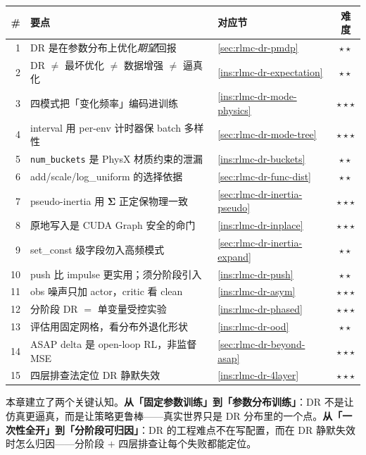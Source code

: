 \begin{center}
\small
\begin{tabular}{@{}rp{6.6cm}lc@{}}
\toprule
\# & 要点 & 对应节 & 难度 \\
\midrule
1 & DR 是在参数分布上优化\emph{期望}回报 & \cref{sec:rlmc-dr-pmdp} & $\star\star$ \\
2 & DR $\neq$ 最坏优化 $\neq$ 数据增强 $\neq$ 逼真化 & \cref{ins:rlmc-dr-expectation} & $\star\star$ \\
3 & 四模式把「变化频率」编码进训练 & \cref{ins:rlmc-dr-mode-physics} & $\star\star\star$ \\
4 & interval 用 per-env 计时器保 batch 多样性 & \cref{sec:rlmc-dr-mode-tree} & $\star\star\star$ \\
5 & \verb|num_buckets| 是 PhysX 材质约束的泄漏 & \cref{ins:rlmc-dr-buckets} & $\star\star$ \\
6 & add/scale/log\_uniform 的选择依据 & \cref{sec:rlmc-dr-func-dist} & $\star\star$ \\
7 & pseudo-inertia 用 $\boldsymbol\Sigma$ 正定保物理一致 & \cref{sec:rlmc-dr-inertia-pseudo} & $\star\star\star$ \\
8 & 原地写入是 CUDA Graph 安全的命门 & \cref{ins:rlmc-dr-inplace} & $\star\star\star$ \\
9 & set\_const 级字段勿入高频模式 & \cref{sec:rlmc-dr-inertia-expand} & $\star\star$ \\
10 & push 比 impulse 更实用；须分阶段引入 & \cref{ins:rlmc-dr-push} & $\star\star$ \\
11 & obs 噪声只加 actor，critic 看 clean & \cref{ins:rlmc-dr-asym} & $\star\star\star$ \\
12 & 分阶段 DR $=$ 单变量受控实验 & \cref{ins:rlmc-dr-phased} & $\star\star\star$ \\
13 & 评估用固定网格，看分布外退化形状 & \cref{ins:rlmc-dr-ood} & $\star\star$ \\
14 & ASAP delta 是 open-loop RL，非监督 MSE & \cref{sec:rlmc-dr-beyond-asap} & $\star\star\star$ \\
15 & 四层排查法定位 DR 静默失效 & \cref{ins:rlmc-dr-4layer} & $\star\star\star$ \\
\bottomrule
\end{tabular}
\end{center}

本章建立了两个关键认知。\textbf{从「固定参数训练」到「参数分布训练」}：DR 不是让仿真更逼真，而是让策略更鲁棒——真实世界只是 DR 分布里的一个点。\textbf{从「一次性全开」到「分阶段可归因」}：DR 的工程难点不在写配置，而在 DR 静默失效时怎么归因——分阶段 $+$ 四层排查让每个失败都能定位。

